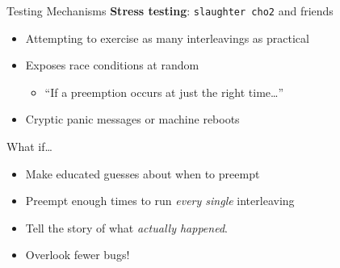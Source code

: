 \documentclass[xcolor=dvipsnames]{beamer}
\begin{document}
\begin{frame}{Testing Mechanisms}
	\textbf{Stress testing}: \texttt{slaughter cho2} and friends
	\begin{itemize}
		\item Attempting to exercise as many interleavings as practical
		\item Exposes race conditions at random
		\begin{itemize}
			\item ``If a preemption occurs at just the right time\ldots''
		\end{itemize}
		\item Cryptic panic messages or machine reboots
	\end{itemize}
	What if\ldots
	\begin{itemize}
		\item Make educated guesses about when to preempt
		\item Preempt enough times to run {\em every single} interleaving
		\item Tell the story of what {\em actually happened}.
		\item Overlook fewer bugs!
	\end{itemize}
\end{frame}

\end{document}
